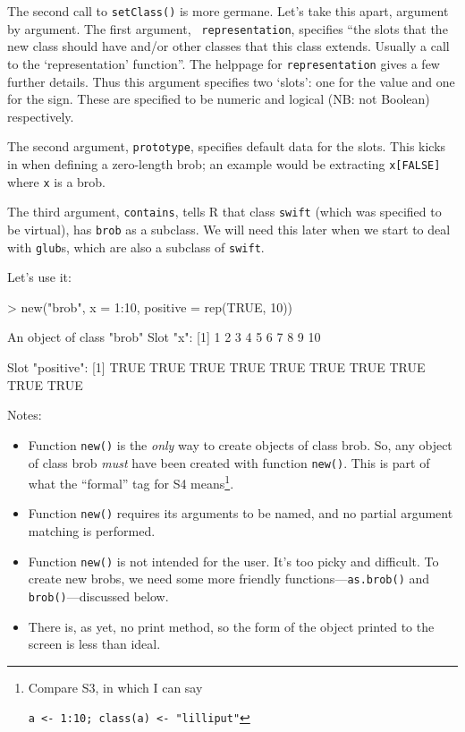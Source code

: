 \documentclass[a4paper]{article}
\begin{document}
The second call to {\tt setClass()} is more germane.  Let's take this
apart, argument by argument.  The first argument, {\tt
representation}, specifies ``the slots that the new class should have
and/or other classes that this class extends.  Usually a call to the
`representation' function''.  The helppage for {\tt representation}
gives a few further details.  Thus this argument specifies two
`slots': one for the value and one for the sign.  These are specified
to be numeric and logical (NB: not Boolean) respectively.

The second argument, {\tt prototype}, specifies default data for the
slots.  This kicks in when defining a zero-length brob; an example
would be extracting {\tt x[FALSE]} where {\tt x} is a brob.

The third argument, {\tt contains}, tells R that class {\tt swift}
(which was specified to be virtual), has {\tt brob} as a subclass.
We will need this later when we start to deal with {\tt glub}s, which
are also a subclass of {\tt swift}.

Let's use it:

\begin{Schunk}
\begin{Sinput}
> new("brob", x = 1:10, positive = rep(TRUE, 10))
\end{Sinput}
\begin{Soutput}
An object of class "brob"
Slot "x":
 [1]  1  2  3  4  5  6  7  8  9 10

Slot "positive":
 [1] TRUE TRUE TRUE TRUE TRUE TRUE TRUE TRUE TRUE TRUE
\end{Soutput}
\end{Schunk}

Notes:
\begin{itemize}
\item Function {\tt new()} is the {\em only} way to create objects
  of class brob.  So, any object of class brob {\em must} have been
  created with function {\tt new()}.  This is part of what the
  ``formal'' tag for S4 means\footnote{Compare S3, in which I can say

  {\tt a <- 1:10; class(a) <- "lilliput"}}.
\item Function {\tt new()} requires its arguments to be named, and no
  partial argument matching is performed.
\item Function {\tt new()} is not intended for the user.   It's too
  picky and difficult.  To create new brobs, we need some more
  friendly functions---{\tt as.brob()} and {\tt brob()}---discussed
  below.
\item There is, as yet, no print method, so the form of the object
  printed to the screen is less than ideal.
\end{itemize}
\end{document}
